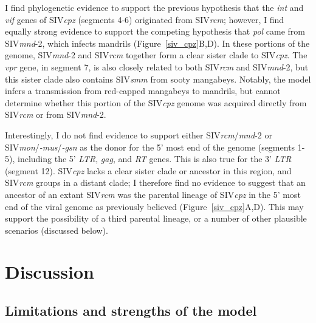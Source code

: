 I find phylogenetic evidence to support the previous hypothesis \citep{bailes2003hybrid,etienne2013gene} that the \textit{int} and \textit{vif} genes of SIV\textit{cpz} (segments 4-6) originated from SIV\textit{rcm}; however, I find equally strong evidence to support the competing hypothesis that \textit{pol} came from SIV\textit{mnd}-2, which infects mandrils (Figure~\ref{siv_cpz}B,D).
In these portions of the genome, SIV\textit{mnd}-2 and SIV\textit{rcm} together form a clear sister clade to SIV\textit{cpz}.
The \textit{vpr} gene, in segment 7, is also closely related to both SIV\textit{rcm} and SIV\textit{mnd}-2, but this sister clade also contains SIV\textit{smm} from sooty mangabeys.
Notably, the model infers a transmission from red-capped mangabeys to mandrils, but cannot determine whether this portion of the SIV\textit{cpz} genome was acquired directly from SIV\textit{rcm} or from SIV\textit{mnd}-2.

Interestingly, I do not find evidence to support either SIV\textit{rcm}/\textit{mnd}-2 or SIV\textit{mon}/\textit{-mus}/\textit{-gsn} as the donor for the 5' most end of the genome (segments 1-5), including the 5' \textit{LTR}, \textit{gag}, and \textit{RT} genes.
This is also true for the 3' \textit{LTR} (segment 12).
SIV\textit{cpz} lacks a clear sister clade or ancestor in this region, and SIV\textit{rcm} groups in a distant clade; I therefore find no evidence to suggest that an ancestor of an extant SIV\textit{rcm} was the parental lineage of SIV\textit{cpz} in the 5' most end of the viral genome as previously believed (Figure~\ref{siv_cpz}A,D).
This may support the possibility of a third parental lineage, or a number of other plausible scenarios (discussed below).


\section{Discussion}

\subsection{Limitations and strengths of the model}
